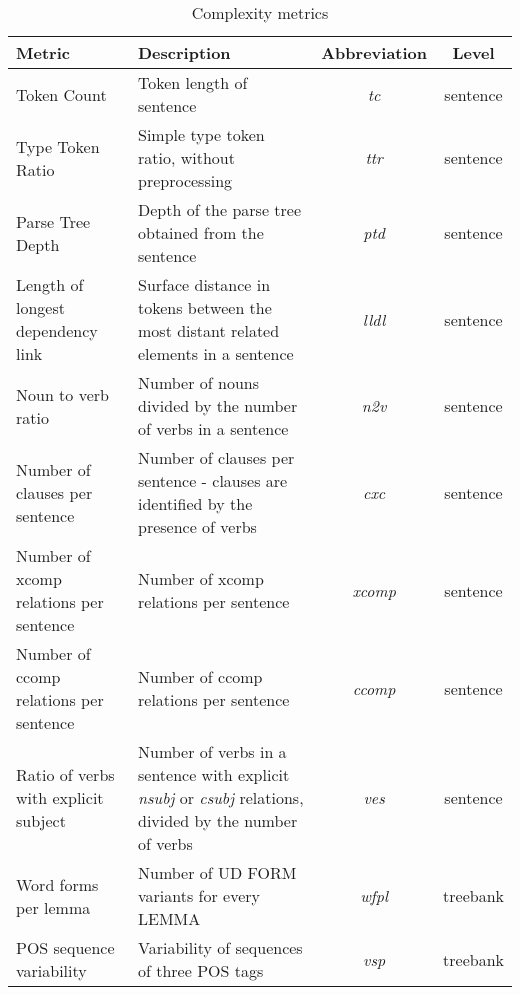\begin{table*}[ht]
    \centering
    \begin{tabular}{p{100px}p{150px}cc}
        \hline
        \textbf{Metric} & \textbf{Description} & \textbf{Abbreviation} & \textbf{Level} \\
        \hline
        Token Count & Token length of sentence & \emph{tc} & sentence \\
        \hline
        Type Token Ratio & Simple type token ratio, without preprocessing & \emph{ttr} & sentence \\
        \hline
        Parse Tree Depth & Depth of the parse tree obtained from the sentence & \emph{ptd} & sentence \\
        \hline
        Length of longest dependency link & Surface distance in tokens between the most distant related elements in a sentence & \emph{lldl} & sentence \\
        \hline
        Noun to verb ratio & Number of nouns divided by the number of verbs in a sentence & \emph{n2v} & sentence \\
        \hline
        Number of clauses per sentence & Number of clauses per sentence - clauses are identified by the presence of verbs & \emph{cxc} & sentence \\
        \hline
        Number of xcomp relations per sentence & Number of xcomp relations per sentence & \emph{xcomp} & sentence \\
        \hline
        Number of ccomp relations per sentence & Number of ccomp relations per sentence & \emph{ccomp} & sentence \\
        \hline
        Ratio of verbs with explicit subject & Number of verbs in a sentence with explicit \emph{nsubj} or \emph{csubj} relations, divided by the number of verbs & \emph{ves} & sentence \\
        \hline
        Word forms per lemma & Number of UD FORM variants for every LEMMA & \emph{wfpl} & treebank \\
        \hline
        POS sequence variability & Variability of sequences of three POS tags & \emph{vsp} & treebank \\
        \hline
    \end{tabular}
    \caption{Complexity metrics}
    \label{tab:metrics}
\end{table*}